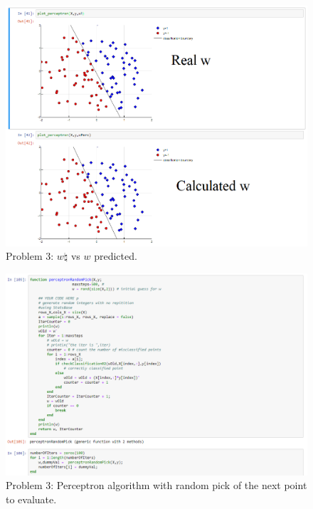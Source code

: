 \documentclass[12pt]{article}
\begin{document}
\begin{figure}[H]
\centering
    \includegraphics[width=450 pt]{realvshypo.png}
    \caption{Problem 3: $w\natural$ vs $w$ predicted.}
    \label{fig:vs}
\end{figure}


\begin{figure}[H]
\centering
    \includegraphics[width=450 pt]{perAlgoRand.png}
    \caption{Problem 3: Perceptron algorithm with random pick of the next point to evaluate.}
    \label{fig:vs}
\end{figure}
\end{document}
